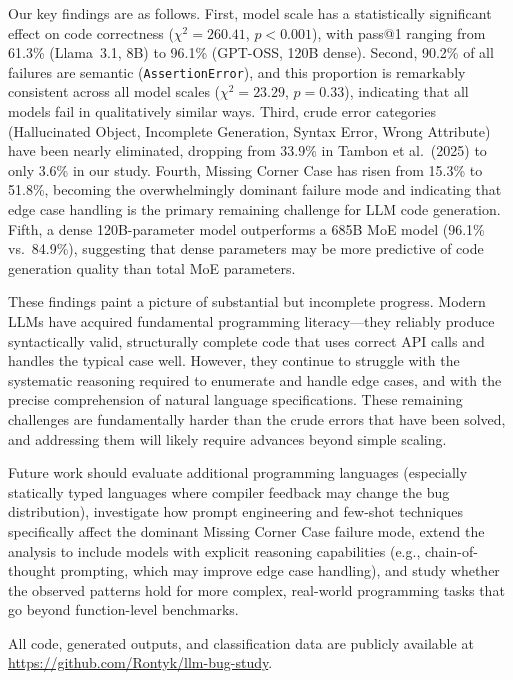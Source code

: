 \documentclass[smallextended]{svjour3}
\begin{document}
Our key findings are as follows. First, model scale has a statistically significant effect on code correctness ($\chi^2 = 260.41$, $p < 0.001$), with pass@1 ranging from 61.3\% (Llama~3.1, 8B) to 96.1\% (GPT-OSS, 120B dense). Second, 90.2\% of all failures are semantic (\texttt{AssertionError}), and this proportion is remarkably consistent across all model scales ($\chi^2 = 23.29$, $p = 0.33$), indicating that all models fail in qualitatively similar ways. Third, crude error categories (Hallucinated Object, Incomplete Generation, Syntax Error, Wrong Attribute) have been nearly eliminated, dropping from 33.9\% in Tambon et al.\ (2025) to only 3.6\% in our study. Fourth, Missing Corner Case has risen from 15.3\% to 51.8\%, becoming the overwhelmingly dominant failure mode and indicating that edge case handling is the primary remaining challenge for LLM code generation. Fifth, a dense 120B-parameter model outperforms a 685B MoE model (96.1\% vs.\ 84.9\%), suggesting that dense parameters may be more predictive of code generation quality than total MoE parameters.

These findings paint a picture of substantial but incomplete progress. Modern LLMs have acquired fundamental programming literacy---they reliably produce syntactically valid, structurally complete code that uses correct API calls and handles the typical case well. However, they continue to struggle with the systematic reasoning required to enumerate and handle edge cases, and with the precise comprehension of natural language specifications. These remaining challenges are fundamentally harder than the crude errors that have been solved, and addressing them will likely require advances beyond simple scaling.

Future work should evaluate additional programming languages (especially statically typed languages where compiler feedback may change the bug distribution), investigate how prompt engineering and few-shot techniques specifically affect the dominant Missing Corner Case failure mode, extend the analysis to include models with explicit reasoning capabilities (e.g., chain-of-thought prompting, which may improve edge case handling), and study whether the observed patterns hold for more complex, real-world programming tasks that go beyond function-level benchmarks.

\begin{acknowledgements}
All code, generated outputs, and classification data are publicly available at \url{https://github.com/Rontyk/llm-bug-study}.
\end{acknowledgements}
\end{document}
